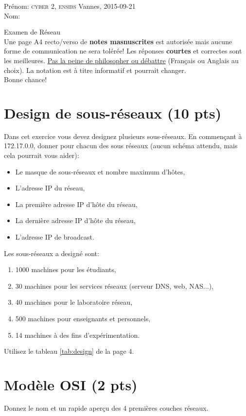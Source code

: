 \documentclass[11pt]{article}
\begin{document}
\noindent Prénom: \hfill {\scshape cyber} 2, {\scshape ensibs} Vannes, 2015-09-21 \\
Nom:
\begin{center}
	{\LARGE{Examen de Réseau}} \\ \vspace{10pt}
	Une page A4 recto/verso de \textbf{notes masnuscrites} est autorisée mais aucune forme de communication ne sera tolérée!
	Les réponses \textbf{courtes} et correctes sont les meilleures. \underline{Pas la peine de philosopher ou débattre} (Français ou Anglais au choix). La notation est à titre informatif et pourrait changer. \\
	Bonne chance!
\end{center}

\section{Design de sous-réseaux (10 pts)}
	Dans cet exercice vous devez designez plusieurs sous-réseaux. En commençant à 172.17.0.0, donner pour chacun des sous réseaux (aucun schéma attendu, mais cela pourrait vous aider):
	\begin{itemize}
		\item Le masque de sous-réseaux et nombre maximum d'hôtes,
		\item L'adresse IP du réseau,
		\item La première adresse IP d'hôte du réseau,
		\item La dernière adresse IP d'hôte du réseau,
		\item L'adresse IP de broadcast.
	\end{itemize}
	Les sous-réseaux a designé sont:
	\begin{enumerate}
		\item 1000 machines pour les étudiants,
		\item 30 machines pour les services réseaux (serveur DNS, web, NAS...),
		\item 40 machines pour le laboratoire réseau,
		\item 500 machines pour enseignants et personnels,
		\item 14 machines à des fins d'expérimentation.
	\end{enumerate}
Utilisez le tableau \ref{tab:design} de la page 4.

\section{Modèle OSI (2 pts)}
	Donnez le nom et un rapide aperçu des 4 premières couches réseaux.
\pagebreak
\end{document}
